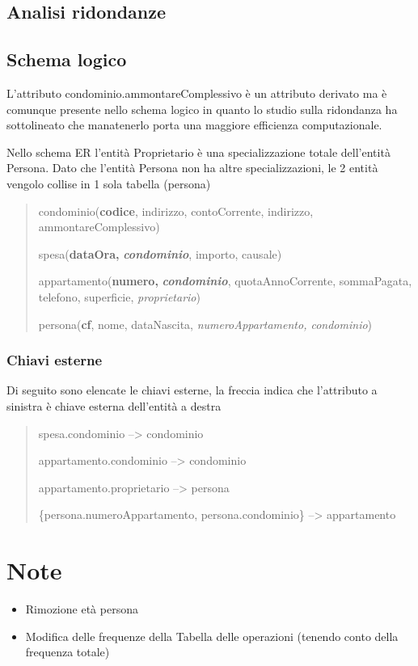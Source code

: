 \documentclass[
]{article}
\providecommand{\tightlist}{%
  \setlength{\itemsep}{0pt}\setlength{\parskip}{0pt}}
\begin{document}
\hypertarget{analisi-ridondanze}{%
\subsection{Analisi ridondanze}\label{analisi-ridondanze}}

\hypertarget{schema-logico}{%
\subsection{Schema logico}\label{schema-logico}}

L'attributo condominio.ammontareComplessivo è un attributo derivato ma è
comunque presente nello schema logico in quanto lo studio sulla
ridondanza ha sottolineato che manatenerlo porta una maggiore efficienza
computazionale.

Nello schema ER l'entità Proprietario è una specializzazione totale
dell'entità Persona. Dato che l'entità Persona non ha altre
specializzazioni, le 2 entità vengolo collise in 1 sola tabella
(persona)

\begin{quote}
condominio(\textbf{codice}, indirizzo, contoCorrente, indirizzo,
ammontareComplessivo)

spesa(\textbf{dataOra,} \textbf{\emph{condominio}}, importo, causale)

appartamento(\textbf{numero,} \textbf{\emph{condominio}},
quotaAnnoCorrente, sommaPagata, telefono, superficie,
\emph{proprietario})

persona(\textbf{cf}, nome, dataNascita, \emph{numeroAppartamento,
condominio})
\end{quote}

\hypertarget{chiavi-esterne}{%
\subsubsection{Chiavi esterne}\label{chiavi-esterne}}

Di seguito sono elencate le chiavi esterne, la freccia indica che
l'attributo a sinistra è chiave esterna dell'entità a destra

\begin{quote}
spesa.condominio --\textgreater{} condominio

appartamento.condominio --\textgreater{} condominio

appartamento.proprietario --\textgreater{} persona

\{persona.numeroAppartamento, persona.condominio\} --\textgreater{}
appartamento
\end{quote}

\hypertarget{note}{%
\section{Note}\label{note}}

\begin{itemize}
\tightlist
\item
  Rimozione età persona
\item
  Modifica delle frequenze della Tabella delle operazioni (tenendo conto
  della frequenza totale)
\end{itemize}
\end{document}
